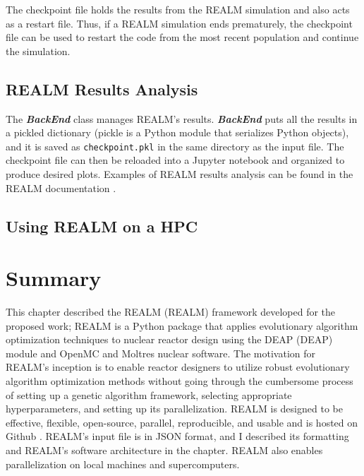 The checkpoint file holds the results from the REALM simulation and also acts 
as a restart file. 
Thus, if a REALM simulation ends prematurely, the checkpoint file can be used 
to restart the code from the most recent population and continue the simulation. 

\subsection{REALM Results Analysis}
The \textbf{\textit{BackEnd}} class manages REALM's results. 
\textbf{\textit{BackEnd}} puts all the results in a pickled dictionary 
(pickle is a Python module that serializes Python objects), and it is saved as 
\texttt{checkpoint.pkl} in the same directory as the input file. 
The checkpoint file can then be reloaded into a Jupyter notebook and organized 
to produce desired plots. 
Examples of REALM results analysis can be found in the REALM documentation 
\cite{chee_arfcrealm_2021}. 

\subsection{Using REALM on a HPC}



\section{Summary}
This chapter described the \acrlong{REALM} (REALM) framework developed for the
proposed work; REALM is a Python package that applies evolutionary algorithm 
optimization techniques to nuclear reactor design using the \acrlong{DEAP} (DEAP) 
module and OpenMC and Moltres nuclear software. 
The motivation for REALM's inception is to enable reactor designers to utilize 
robust evolutionary algorithm optimization methods without going 
through the cumbersome process of setting up a genetic algorithm framework,
selecting appropriate hyperparameters, and setting up its parallelization. 
REALM is designed to be effective, flexible, open-source, parallel, 
reproducible, and usable and is hosted on Github \cite{chee_arfcrealm_2021}. 
REALM's input file is in JSON format, and I described its formatting and REALM's 
software architecture in the chapter. 
REALM also enables parallelization on local machines and supercomputers. 